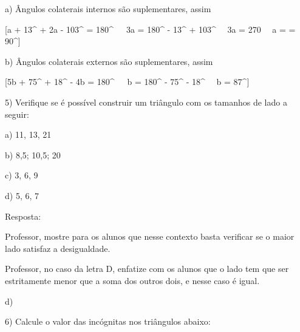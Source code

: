 a) Ângulos colaterais internos são suplementares, assim

[a + 13{^\circ} + 2a - 103{^\circ} = 180{^\circ}\  \rightarrow \ \ 3a = 180{^\circ} - 13{^\circ} + 103{^\circ} \rightarrow \ \ 3a = 270 \rightarrow \ \ a =  = 90{^\circ}]

b) Ângulos colaterais externos são suplementares, assim

[5b + 75{^\circ} + 18{^\circ} - 4b = 180{^\circ}\  \rightarrow \ \ b = 180{^\circ} - 75{^\circ} - 18{^\circ} \rightarrow \ \ b = 87{^\circ}]

5) Verifique se é possível construir um triângulo com os tamanhos de
lado a seguir:

a) 11, 13, 21

b) 8,5; 10,5; 20

c) 3, 6, 9

d) 5, 6, 7

Resposta:

Professor, mostre para os alunos que nesse contexto basta verificar se o
maior lado satisfaz a desigualdade.




Professor, no caso da letra D, enfatize com os alunos que o lado tem que
ser estritamente menor que a soma dos outros dois, e nesse caso é igual.

d)

6) Calcule o valor das incógnitas nos triângulos abaixo:

